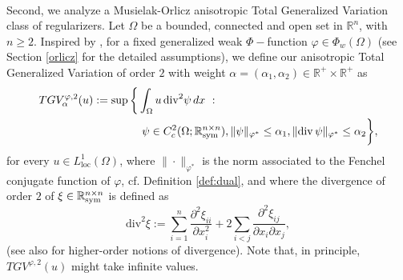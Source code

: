 \documentclass[a4paper,11pt,oneside,notitlepage]{article}
\numberwithin{equation}{section}
\def\R{\mathbb{R}}
\def\sym{{\rm sym}}
\renewcommand{\div}{\mathrm{div}}
\newcommand{\vphi}{\varphi}
\newcommand{\st}{ \ : \ }
\begin{document}
\\
Second, we analyze a Musielak-Orlicz anisotropic Total Generalized Variation class of regularizers. Let $\Omega$ be a bounded, connected and open set in $\R^n$, with $n \ge 2$. Inspired by \cite{BKP10}, for a fixed generalized weak $\Phi-$function $\vphi \in \Phi_w(\Omega)$ (see Section \ref{orlicz} for the detailed assumptions), we define our anisotropic Total Generalized Variation of order $2$ with weight $\alpha = (\alpha_1, \alpha_2) \in \R^+ \times \R^+$ as
\begin{equation}
\label{TGV}
\begin{aligned}
    TGV^{\vphi,2}_\alpha(u):= \sup\bigg\{ &\int_\Omega u \,\div^2 \psi \, dx \st \\
    & \ \psi \in C^2_c (\Omega; \R^{n \times n}_\sym), \|\psi\|_{\vphi^*} \le \alpha_1, \|\div \, \psi\|_{\vphi^*} \le \alpha_2 \bigg\},
\end{aligned}
\end{equation}
for every $u \in L^1_{\textrm{loc}}(\Omega)$, where $\|\cdot\|_{\vphi^*}$ is the norm associated to the Fenchel conjugate function of $\vphi$, cf. Definition \ref{def:dual}, and where the divergence of order $2$ of $\xi \in \R^{n \times n}_\sym$ is defined as
\begin{equation*}
    \div^2 \xi := \sum_{i = 1}^n \frac{\partial^2 \xi_{ii}}{\partial x_i^2} + 2 \sum_{i<j} \frac{\partial^2 \xi_{ij}}{\partial x_i \partial x_j},
\end{equation*}
(see also \cite{BKP10} for higher-order notions of divergence). Note that, in principle, $TGV^{\varphi,2}(u)$ might take infinite values.
\end{document}
